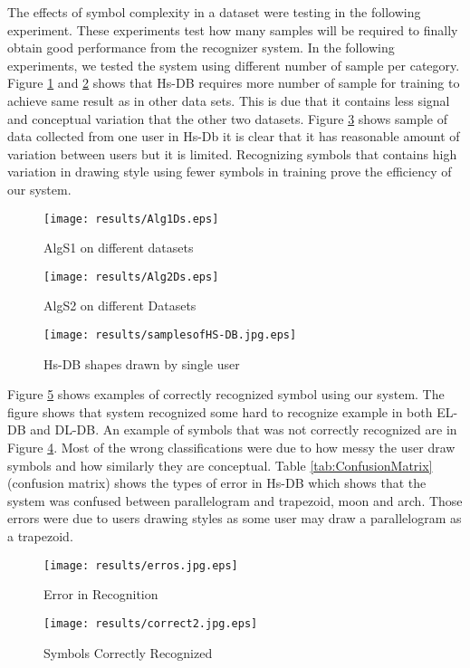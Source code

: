  The effects of symbol complexity in a dataset were testing in the following experiment. These experiments test how many samples will be required to finally obtain good performance from the recognizer system. In the following experiments, we tested the system using different number of sample per category. 
 Figure \ref{fig:Alg1Ds} and \ref{fig:Alg2Ds} shows that Hs-DB requires more number of sample for training to achieve same result as in other data sets. This is due that it contains less signal and conceptual variation that the other two datasets. Figure \ref{fig:samplesofHS-DB.jpg} shows sample of data collected from one user in Hs-Db it is clear that it has reasonable amount of variation between users but it is limited. Recognizing symbols that contains high variation in drawing style using fewer symbols in training prove the efficiency of our system.
 \begin{figure}
	\centering
		\texttt{[image: results/Alg1Ds.eps]}
	\caption{AlgS1 on different datasets}
	\label{fig:Alg1Ds}
\end{figure}
\begin{figure}
	\centering
		\texttt{[image: results/Alg2Ds.eps]}
	\caption{AlgS2 on different Datasets }
	\label{fig:Alg2Ds}
\end{figure}
 \begin{figure}
	\centering
	\texttt{[image: results/samplesofHS-DB.jpg.eps]}
	\caption{Hs-DB shapes drawn by single user}
	\label{fig:samplesofHS-DB.jpg}
\end{figure}
  Figure \ref{fig:correct2.jpg} shows examples of correctly recognized symbol using our system. The figure shows that system recognized some hard to recognize example in both EL-DB and DL-DB. An example of symbols that was not correctly recognized are in Figure \ref{fig:erros}. Most of the wrong classifications were due to how messy the user draw symbols and how similarly they are conceptual.  Table \ref{tab:ConfusionMatrix} (confusion matrix) shows the types of error in Hs-DB which shows that the system was confused between parallelogram and trapezoid, moon and arch. Those errors were due to users drawing styles as some user may draw a parallelogram as a trapezoid. 
  
\begin{figure}
	\centering
		\texttt{[image: results/erros.jpg.eps]}
	\caption{Error in Recognition }
	\label{fig:erros}
\end{figure}
\begin{figure}
	\centering
		\texttt{[image: results/correct2.jpg.eps]}
	\caption{Symbols Correctly Recognized}
	\label{fig:correct2.jpg}
\end{figure}

